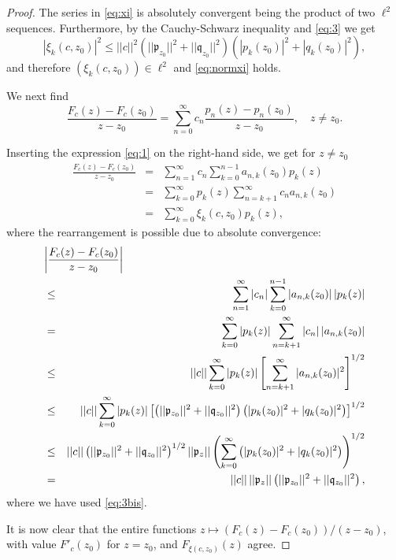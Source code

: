 \documentclass [12pt]{article}
\begin{document}
\begin{proof} The series in \eqref{eq:xi} is absolutely convergent being the product of two $\ell^2$ sequences. Furthermore, by the Cauchy-Schwarz inequality and \eqref{eq:3} we get
$$
|\xi_k(c,z_0)|^2\le ||c||^2 (||\mathfrak{p}_{z_0}||^2+||\mathfrak{q}_{z_0}||^2)\left(|p_k(z_0)|^2+|q_k(z_0)|^2\right),
$$
and therefore $(\xi_k(c,z_0))\in\ell^2$ and \eqref{eq:normxi} holds.

We next find
$$
\frac{F_c(z)-F_c(z_0)}{z-z_0}=\sum_{n=0}^\infty c_n\frac{p_n(z)-p_n(z_0)}{z-z_0},\quad z\neq z_0.
$$ 

 Inserting the expression
\eqref{eq:1} on the right-hand side, we get for $z\neq z_0$
\begin{eqnarray*}
\frac{F_c(z)-F_c(z_0)}{z-z_0}&=&\sum_{n=1}^\infty c_n\sum_{k=0}^{n-1} a_{n,k}(z_0)p_k(z)\\
&=&\sum_{k=0}^\infty p_k(z) \sum_{n=k+1}^\infty c_n a_{n,k}(z_0)\\
&=&\sum_{k=0}^\infty\xi_k(c,z_0) p_k(z),
\end{eqnarray*}
where the rearrangement is possible due to absolute convergence:
\begin{eqnarray*}
\lefteqn{\left|\frac{F_c(z)-F_c(z_0)}{z-z_0}\right| }\\
&\le& \sum_{n=1}^\infty |c_n|\sum_{k=0}^{n-1} |a_{n,k}(z_0)|\,|p_k(z)|\\
&=&\sum_{k=0}^\infty |p_k(z)| \sum_{n=k+1}^\infty |c_n|\,|a_{n,k}(z_0)| \\
&\le& ||c||\sum_{k=0}^\infty |p_k(z)|\left[\sum_{n=k+1}^\infty |a_{n,k}(z_0)|^2\right]^{1/2}\\
&\le& ||c||\sum_{k=0}^\infty |p_k(z)|\left[\left(||\mathfrak{p}_{z_0}||^2+||\mathfrak{q}_{z_0}||^2\right)\left(|p_k(z_0)|^2+|q_k(z_0)|^2\right)\right]^{1/2}\\
&\le& ||c||\left(||\mathfrak{p}_{z_0}||^2+||\mathfrak{q}_{z_0}||^2\right)^{1/2}||\mathfrak{p}_z||\left(\sum_{k=0}^\infty\left(|p_k(z_0)|^2+|q_k(z_0)|^2\right)\right)^{1/2}\\
&=&||c||\,||\mathfrak{p}_z||\left(||\mathfrak{p}_{z_0}||^2+||\mathfrak{q}_{z_0}||^2\right),
\end{eqnarray*}
where we have used \eqref{eq:3bis}. 

It is now clear that the entire functions
$z\mapsto (F_c(z)-F_c(z_0))/(z-z_0)$, with value $F'_c(z_0)$ for $z=z_0$, and $F_{\xi(c,z_0)}(z)$ agree.
\end{proof}
\end{document}
